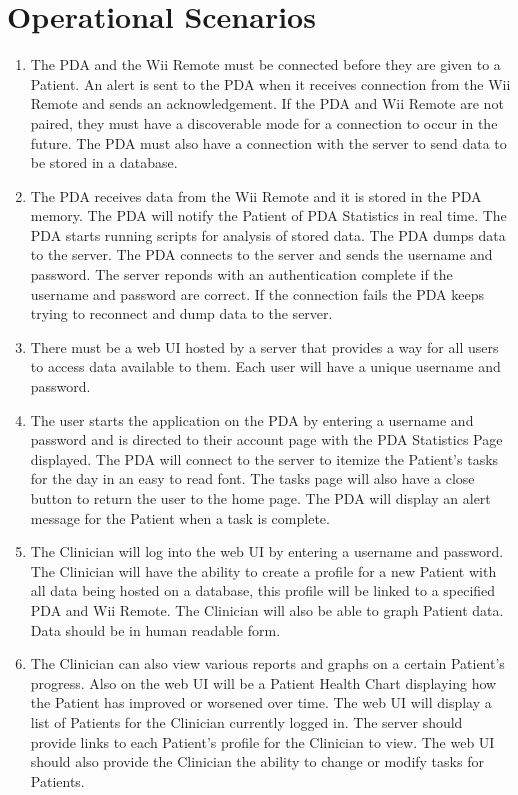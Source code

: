 \documentclass{article}
\begin{document}
\section{Operational Scenarios}
\begin{enumerate}
\item The PDA and the Wii Remote must be connected before they are given to a Patient.  An alert is sent to the PDA when it receives connection from the Wii Remote and sends an acknowledgement.  If the PDA and Wii Remote are not paired, they must have a discoverable mode for a connection to occur in the future.  The PDA must also have a connection with the server to send data to be stored in a database.

\item The PDA receives data from the Wii Remote and it is stored in the PDA memory.  The PDA will notify the Patient of PDA Statistics in real time.  The PDA starts running scripts for analysis of stored data.  The PDA dumps data to the server. The PDA connects to the server and sends the username and password. The server reponds with an authentication complete if the username and password are correct.  If the connection fails the PDA keeps trying to reconnect and dump data to the server.

\item There must be a web UI hosted by a server that provides a way for all users to access data available to them.  Each user will have a unique username and password.

\item The user starts the application on the PDA by entering a username and password and is directed to their account page with the PDA Statistics Page displayed.  The PDA will connect to the server to itemize the Patient's tasks for the day in an easy to read font.  The tasks page will also have a close button to return the user to the home page.  The PDA will display an alert message for the Patient when a task is complete.

\item The Clinician will log into the web UI by entering a username and password.  The Clinician will have the ability to create a profile for a new Patient with all data being hosted on a database, this profile will be linked to a specified PDA and Wii Remote.  The Clinician will also be able to graph Patient data.  Data should be in human readable form.

\item The Clinician can also view various reports and graphs on a certain Patient's progress.  Also on the web UI will be a Patient Health Chart displaying how the Patient has improved or worsened over time.  The web UI will display a list of Patients for the Clinician currently logged in.  The server should provide links to each Patient's profile for the Clinician to view.  The web UI should also provide the Clinician the ability to change or modify tasks for Patients.


\end{enumerate}
\end{document}
